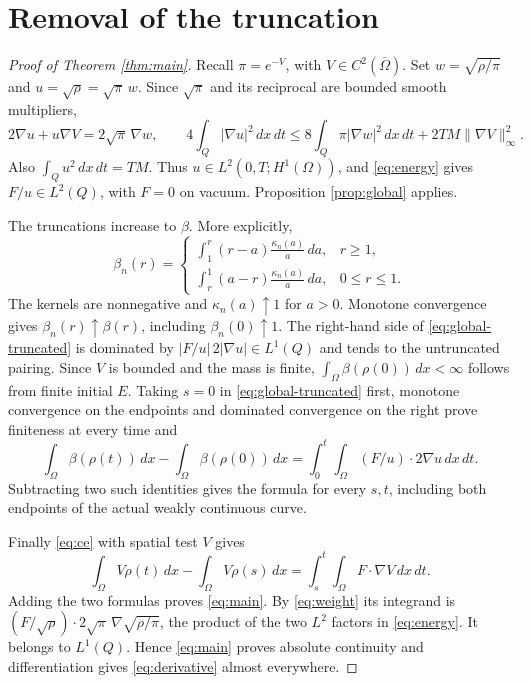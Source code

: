 \documentclass[11pt]{article}
\newcommand{\dd}{\,dx}
\newcommand{\dt}{\,dt}
\newcommand{\grad}{\nabla}
\begin{document}
\section{Removal of the truncation}\label{sec:limit}
\begin{proof}[Proof of Theorem \ref{thm:main}]
Recall $\pi=e^{-V}$, with $V\in C^2(\overline\Omega)$.
Set $w=\sqrt{\rho/\pi}$ and $u=\sqrt\rho=\sqrt\pi\,w$.
Since $\sqrt\pi$ and its reciprocal are bounded smooth multipliers,
\begin{equation}\label{eq:weight}
 2\grad u+u\grad V=2\sqrt\pi\,\grad w,
 \qquad
 4\int_Q|\grad u|^2\dd\dt
 \leq8\int_Q\pi|\grad w|^2\dd\dt
        +2TM\|\grad V\|_\infty^2.
\end{equation}
Also $\int_Q u^2\dd\dt=TM$. Thus $u\in L^2(0,T;H^1(\Omega))$,
and \eqref{eq:energy} gives $F/u\in L^2(Q)$, with $F=0$ on vacuum.
Proposition \ref{prop:global} applies.

The truncations increase to $\beta$. More explicitly,
\[
 \beta_n(r)=
 \begin{cases}
  \displaystyle\int_1^r(r-a)\frac{\kappa_n(a)}a\,da,&r\geq1,\\[6pt]
  \displaystyle\int_r^1(a-r)\frac{\kappa_n(a)}a\,da,&0\leq r\leq1.
 \end{cases}
\]
The kernels are nonnegative and $\kappa_n(a)\uparrow1$ for $a>0$.
Monotone convergence gives $\beta_n(r)\uparrow\beta(r)$, including
$\beta_n(0)\uparrow1$. The right-hand side of
\eqref{eq:global-truncated} is dominated by
$|F/u|\,2|\grad u|\in L^1(Q)$ and tends to the untruncated pairing.
Since $V$ is bounded and the mass is finite,
$\int_\Omega\beta(\rho(0))\dd<\infty$ follows from finite initial $E$.
Taking $s=0$ in \eqref{eq:global-truncated} first, monotone convergence
on the endpoints and dominated convergence on the right prove finiteness at
every time and
\[
 \int_\Omega\beta(\rho(t))\dd
  -\int_\Omega\beta(\rho(0))\dd
 =\int_0^t\!\int_\Omega(F/u)\cdot2\grad u\dd\dt.
\]
Subtracting two such identities gives the formula for every $s,t$, including
both endpoints of the actual weakly continuous curve.

Finally \eqref{eq:ce} with spatial test $V$ gives
\[
 \int_\Omega V\rho(t)\dd-\int_\Omega V\rho(s)\dd
 =\int_s^t\!\int_\Omega F\cdot\grad V\dd\dt.
\]
Adding the two formulas proves \eqref{eq:main}. By \eqref{eq:weight} its
integrand is
$(F/\sqrt\rho)\cdot2\sqrt\pi\,\grad\sqrt{\rho/\pi}$,
the product of the two $L^2$ factors in \eqref{eq:energy}.
It belongs to $L^1(Q)$. Hence \eqref{eq:main} proves absolute continuity
and differentiation gives \eqref{eq:derivative} almost everywhere.
\end{proof}
\end{document}

